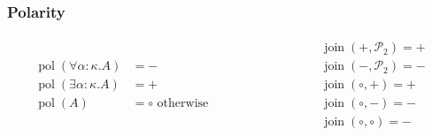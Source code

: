 \documentclass[declaration,shortabstract,english]{iithesis}
\begin{document}
\subsubsection*{Polarity}
\begin{equation*}
  \begin{split}
    \begin{array}{ll}{\operatorname{pol}(\forall \alpha : \kappa . A)} & {=-} \\
    {\operatorname{pol}(\exists \alpha : \kappa . A)} & {=+}
    \\ {\operatorname{pol}(A)} & {=\circ \text { otherwise }}\end{array}
  \end{split}
  \hspace{3cm}
  \begin{split}
    \begin{array}{l}
      {\operatorname{join}\left(+, \mathcal{P}_{2}\right)=+} \\
      {\operatorname{join}\left(-, \mathcal{P}_{2}\right)=-} \\
      {\operatorname{join}(\circ,+)=+} \\
      {\operatorname{join}(\circ,-)=-} \\
      {\operatorname{join}(\circ,\circ)=-}
    \end{array}
  \end{split}
\end{equation*}
\end{document}

